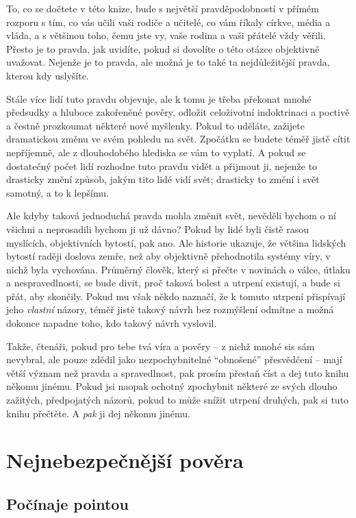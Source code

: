 \documentclass{book}
\begin{document}
To, co se dočtete v této knize, bude s největší pravděpodobností v přímém rozporu s tím, co vás učili vaši rodiče a učitelé, co vám říkaly církve, média a vláda, a s většinou toho, čemu jste vy, vaše rodina a vaši přátelé vždy věřili. Přesto je to pravda, jak uvidíte, pokud si dovolíte o této otázce objektivně uvažovat. Nejenže je to pravda, ale možná je to také ta nejdůležitější pravda, kterou kdy uslyšíte.

Stále více lidí tuto pravdu objevuje, ale k tomu je třeba překonat mnohé předsudky a hluboce zakořeněné pověry, odložit celoživotní indoktrinaci a poctivě a čestně prozkoumat některé nové myšlenky. Pokud to uděláte, zažijete dramatickou změnu ve svém pohledu na svět. Zpočátku se budete téměř jistě cítit nepříjemně, ale z dlouhodobého hlediska se vám to vyplatí. A pokud se dostatečný počet lidí rozhodne tuto pravdu vidět a přijmout ji, nejenže to drasticky změní způsob, jakým tito lidé vidí svět; drasticky to změní i svět samotný, a to k lepšímu.

Ale kdyby taková jednoduchá pravda mohla změnit svět, nevěděli bychom o ní všichni a neprosadili bychom ji už dávno? Pokud by lidé byli čistě rasou myslících, objektivních bytostí, pak ano. Ale historie ukazuje, že většina lidských bytostí raději doslova zemře, než aby objektivně přehodnotila systémy víry, v nichž byla vychována. Průměrný člověk, který si přečte v novinách o válce, útlaku a nespravedlnosti, se bude divit, proč taková bolest a utrpení existují, a bude si přát, aby skončily. Pokud mu však někdo naznačí, že k tomuto utrpení přispívají jeho \emph{vlastní} názory, téměř jistě takový návrh bez rozmýšlení odmítne a možná dokonce napadne toho, kdo takový návrh vyslovil.

Takže, čtenáři, pokud pro tebe tvá víra a pověry -- z nichž mnohé sis sám nevybral, ale pouze zdědil jako nezpochybnitelné \enquote{obnošené} přesvědčení -- mají větší význam než pravda a spravedlnost, pak prosím přestaň číst a dej tuto knihu někomu jinému. Pokud jsi naopak ochotný zpochybnit některé ze svých dlouho zažitých, předpojatých názorů, pokud to může snížit utrpení druhých, pak si tuto knihu přečtěte. A \emph{pak} ji dej někomu jinému.

\chapter{Nejnebezpečnější pověra}

\section{Počínaje pointou}
\end{document}
